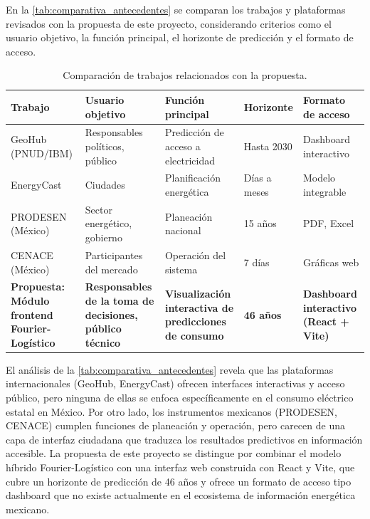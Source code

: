 En la \autoref{tab:comparativa_antecedentes} se comparan los trabajos y plataformas revisados con la propuesta de este proyecto, considerando criterios como el usuario objetivo, la función principal, el horizonte de predicción y el formato de acceso.

\begin{table}[H]
  \centering
  \caption{Comparación de trabajos relacionados con la propuesta.}
  \label{tab:comparativa_antecedentes}
  \begin{tabular}{@{}p{3.0cm}p{2.8cm}p{2.8cm}p{2.5cm}p{2.5cm}@{}}
    \toprule
    \textbf{Trabajo} & \textbf{Usuario objetivo} & \textbf{Función principal} & \textbf{Horizonte} & \textbf{Formato de acceso} \\
    \midrule
    GeoHub (PNUD/IBM) \cite{ibm2024} & Responsables políticos, público & Predicción de acceso a electricidad & Hasta 2030 & Dashboard interactivo \\
    \addlinespace
    EnergyCast \cite{energycast2025} & Ciudades & Planificación energética & Días a meses & Modelo integrable \\
    \addlinespace
    PRODESEN (México) \cite{prodesen2023} & Sector energético, gobierno & Planeación nacional & 15 años & PDF, Excel \\
    \addlinespace
    CENACE (México) \cite{cenace2026} & Participantes del mercado & Operación del sistema & 7 días & Gráficas web \\
    \addlinespace
    \textbf{Propuesta: Módulo frontend Fourier-Logístico} & \textbf{Responsables de la toma de decisiones, público técnico} & \textbf{Visualización interactiva de predicciones de consumo} & \textbf{46 años} & \textbf{Dashboard interactivo (React + Vite)} \\
    \bottomrule
  \end{tabular}
\end{table}

El análisis de la \autoref{tab:comparativa_antecedentes} revela que las plataformas internacionales (GeoHub, EnergyCast) ofrecen interfaces interactivas y acceso público, pero ninguna de ellas se enfoca específicamente en el consumo eléctrico estatal en México. Por otro lado, los instrumentos mexicanos (PRODESEN, CENACE) cumplen funciones de planeación y operación, pero carecen de una capa de interfaz ciudadana que traduzca los resultados predictivos en información accesible. La propuesta de este proyecto se distingue por combinar el modelo híbrido Fourier-Logístico con una interfaz web construida con React y Vite, que cubre un horizonte de predicción de 46 años y ofrece un formato de acceso tipo dashboard que no existe actualmente en el ecosistema de información energética mexicano.